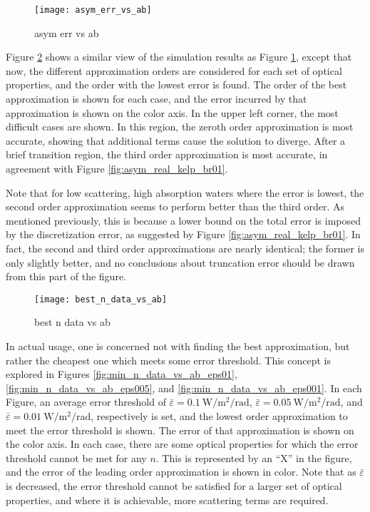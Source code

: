 \begin{figure}[H]
  \centering
  \texttt{[image: asym\_err\_vs\_ab]}
  \caption{asym err vs ab}
  \label{fig:asym_err_vs_ab}
\end{figure}

Figure \ref{fig:best_n_data_vs_ab} shows a similar view of the simulation results as Figure \ref{fig:asym_err_vs_ab}, except that now, the different approximation orders are considered for each set of optical properties, and the order with the lowest error is found.
The order of the best approximation is shown for each case, and the error incurred by that approximation is shown on the color axis.
In the upper left corner, the most difficult cases are shown.
In this region, the zeroth order approximation is most accurate, showing that additional terms cause the solution to diverge.
After a brief transition region, the third order approximation is most accurate, in agreement with Figure \ref{fig:asym_real_kelp_br01}.

Note that for low scattering, high absorption waters where the error is lowest, the second order approximation seems to perform better than the third order.
As mentioned previously, this is because a lower bound on the total error is imposed by the discretization error, as suggested by Figure \ref{fig:asym_real_kelp_br01}.
In fact, the second and third order approximations are nearly identical; the former is only slightly better, and no conclusions about truncation error should be drawn from this part of the figure.

\begin{figure}[H]
  \centering
  \texttt{[image: best\_n\_data\_vs\_ab]}
  \caption{best n data vs ab}
  \label{fig:best_n_data_vs_ab}
\end{figure}

In actual usage, one is concerned not with finding the best approximation, but rather the cheapest one which meets some error threshold.
This concept is explored in Figures \ref{fig:min_n_data_vs_ab_eps01}, \ref{fig:min_n_data_vs_ab_eps005}, and \ref{fig:min_n_data_vs_ab_eps001}.
In each Figure, an average error threshold of $\bar{\varepsilon}=\SI{0.1}{\W\per\m\squared\per\radian}$, $\bar{\varepsilon}=\SI{0.05}{\W\per\m\squared\per\radian}$, and $\bar{\varepsilon}=\SI{0.01}{\W\per\m\squared\per\radian}$, respectively is set, and the lowest order approximation to meet the error threshold is shown.
The error of that approximation is shown on the color axis.
In each case, there are some optical properties for which the error threshold cannot be met for any $n$.
This is represented by an ``X'' in the figure, and the error of the leading order approximation is shown in color.
Note that as $\bar\varepsilon$ is decreased, the error threshold cannot be satisfied for a larger set of optical properties, and where it is achievable, more scattering terms are required.

